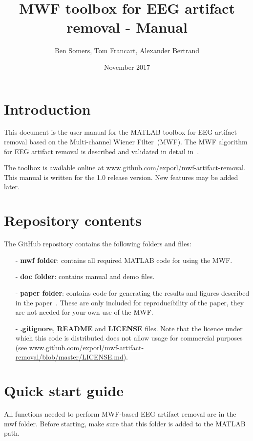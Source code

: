 \documentclass[11pt]{article}
\title{MWF toolbox for EEG artifact removal - Manual}
\author{Ben Somers, Tom Francart, Alexander Bertrand}
\date{November 2017}
\begin{document}
\maketitle
\tableofcontents
\pagebreak

\section{Introduction}

This document is the user manual for the MATLAB toolbox for EEG artifact removal based on the Multi-channel Wiener Filter~(MWF). The MWF algorithm for EEG artifact removal is described and validated in detail in~\cite{somers2018generic}.

The toolbox is available online at \url{www.github.com/exporl/mwf-artifact-removal}. This manual is written for the 1.0 release version. New features may be added later.

\section{Repository contents}

The GitHub repository contains the following folders and files:

\begin{itemize}[noitemsep]
\item[-] \textbf{mwf folder}: contains all required MATLAB code for using the MWF.
\item[-] \textbf{doc folder}: contains manual and demo files.
\item[-] \textbf{paper folder}: contains code for generating the results and figures described in the paper~\cite{somers2018generic}. These are only included for reproducibility of the paper, they are not needed for your own use of the MWF.
\item[-] \textbf{.gitignore}, \textbf{README} and \textbf{LICENSE} files. Note that the licence under which this code is distributed does not allow usage for commercial purposes (see \url{www.github.com/exporl/mwf-artifact-removal/blob/master/LICENSE.md}).
\end{itemize}

\section{Quick start guide}
\label{sec:quickstart}

All functions needed to perform MWF-based EEG artifact removal are in the mwf folder. Before starting, make sure that this folder is added to the MATLAB path.
\end{document}

